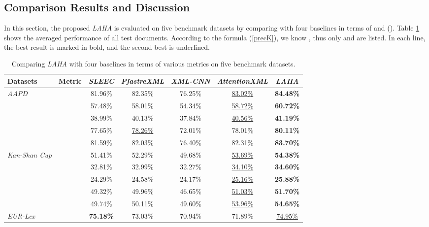 \documentclass[runningheads]{llncs}
\begin{document}
\vspace{-4mm}
\subsection{Comparison Results and Discussion}
In this section, the proposed \textit{LAHA} is evaluated on five benchmark datasets by comparing with four baselines in terms of  and  (). Table \ref{table2} shows the averaged performance of all test documents. According to the formula (\ref{precK}), we know , thus only  and  are listed. In each line, the best result is marked in bold, and the second best is underlined.




\begin{table}[t]\centering
	\small
	\caption{Comparing \textit{LAHA} with four baselines in terms of various metrics on five benchmark datasets.}\label{table2}
	\begin{tabular}{l|c|c|c|c|c|c}
		\hline
Datasets  &Metric &\textit{SLEEC} & \textit{PfastreXML} &\textit{XML-CNN} &\textit{AttentionXML}     & \textit{LAHA}	  \\ \hline
		\multirow{5}{*}{\textit{AAPD}}	 & & 81.96\%& 82.35\% &76.25\% & \underline{83.02\%} &  \textbf{84.48\%} 	  \\ 
		&  &57.48\% & 58.01\% & 54.34\%& \underline{58.72\%} &  \textbf{60.72\%} 	 \\
		&  & 38.99\%& 40.13\% & 37.84\%& \underline{40.56\%} &  \textbf{41.19\%} 	  \\ \cline{2-7}
		&  & 77.65\%& \underline{78.26\%} & 72.01\%& 78.01\% & \textbf{80.11\%} 	 \\
		&  & 81.59\%& 82.03\% &76.40\% & \underline{82.31\%} & \textbf{83.70\%} 	  \\ \hline \hline
		\multirow{5}{*}{\textit{Kan-Shan Cup}}	 & & 51.41\%& 52.29\% &49.68\%& \underline{53.69\%} 	& \textbf{54.38\%} 	  \\ 
		&  & 32.81\%& 32.99\% & 32.27\%& \underline{34.10\%} 	& \textbf{34.60\%} 	 \\
		&  & 24.29\%& 24.58\% &24.17\% & \underline{25.16\%} & 	 \textbf{25.88\%} 	  \\ \cline{2-7}
		&  & 49.32\% & 49.96\% & 46.65\%& \underline{51.03\%} & \textbf{51.70\%} 	 \\
		&  & 49.74\%& 50.11\% &49.60\% & \underline{53.96\%} &  \textbf{54.65\%} 	  \\ \hline \hline
\multirow{5}{*}{\textit{EUR-Lex}}	 & &\textbf{75.18\%} &  73.03\%&70.94\% & 71.89\% 	&  \underline{74.95\%}	  \\ 

\end{tabular}
\end{table}
\end{document}
